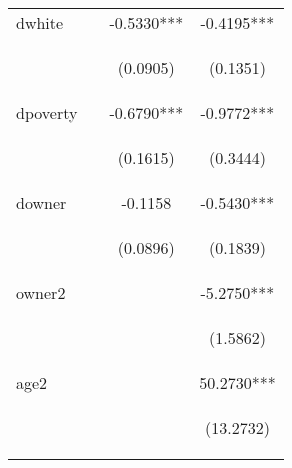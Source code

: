 \begin{center}
\begin{tabular}{lccc}
dwhite &  & -0.5330*** & -0.4195*** \\
\vspace{4pt} & \begin{footnotesize}\end{footnotesize} & \begin{footnotesize}(0.0905)\end{footnotesize} & \begin{footnotesize}(0.1351)\end{footnotesize} \\
dpoverty &  & -0.6790*** & -0.9772*** \\
\vspace{4pt} & \begin{footnotesize}\end{footnotesize} & \begin{footnotesize}(0.1615)\end{footnotesize} & \begin{footnotesize}(0.3444)\end{footnotesize} \\
downer &  & -0.1158 & -0.5430*** \\
\vspace{4pt} & \begin{footnotesize}\end{footnotesize} & \begin{footnotesize}(0.0896)\end{footnotesize} & \begin{footnotesize}(0.1839)\end{footnotesize} \\
owner2 &  &  & -5.2750*** \\
\vspace{4pt} & \begin{footnotesize}\end{footnotesize} & \begin{footnotesize}\end{footnotesize} & \begin{footnotesize}(1.5862)\end{footnotesize} \\
age2 &  &  & 50.2730*** \\
\vspace{4pt} & \begin{footnotesize}\end{footnotesize} & \begin{footnotesize}\end{footnotesize} & \begin{footnotesize}(13.2732)\end{footnotesize} \\

\end{tabular}
\end{center}
